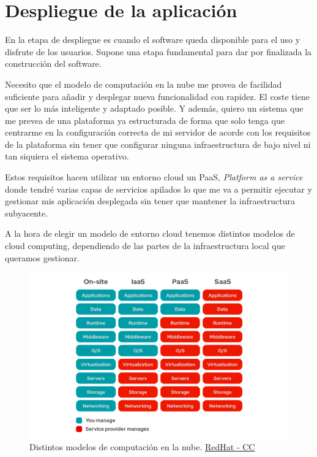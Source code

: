 \chapter{Despliegue de la aplicación}
En la etapa de despliegue es cuando el software queda disponible para el uso y disfrute de
los usuarios. Supone una etapa fundamental para dar por finalizada la construcción del
software. 

Necesito que el modelo de computación en la nube me provea de facilidad suficiente para
añadir y desplegar nueva funcionalidad con rapidez. El coste tiene que ser lo más
inteligente y adaptado posible. Y además, quiero un sistema que me prevea de una
plataforma ya estructurada de forma que solo tenga que centrarme en la configuración
correcta de mi servidor de acorde con los requisitos de la plataforma sin tener que
configurar ninguna infraestructura de bajo nivel ni tan siquiera el sistema operativo.

Estos requisitos hacen utilizar un entorno cloud un PaaS, \textit{Platform as a service}
donde tendré varias capas de servicios apilados lo que me va a permitir ejecutar y
gestionar mis aplicación desplegada sin tener que mantener la infraestructura subyacente.

A la hora de elegir un modelo de entorno cloud tenemos distintos modelos de cloud
computing, dependiendo de las partes de la infraestructura local que queramos gestionar.

\FloatBarrier
\begin{figure}[h]
	\centering	
	\includegraphics[width=\textwidth]{doc/logos/imgs/iaas-paas.png}
    \caption{ Distintos modelos de computación en la nube.
	\href{https://www.redhat.com/es/topics/cloud-computing/iaas-vs-paas-vs-saas}{RedHat -
	CC}}
    \label{fig:tipos-de-cc}
\end{figure}
\FloatBarrier

